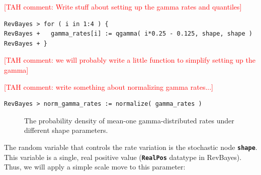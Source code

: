 \documentclass[11pt]{article}
\newcommand{\taha}[1]{{\textcolor{red}{[TAH comment: #1]}}} %
\newcommand{\cl}[1]{{\texttt{\textbf{#1}}}}
\begin{document}
\taha{Write stuff about setting up the gamma rates and quantiles}
{\tt\begin{snugshade*}
\begin{lstlisting}
RevBayes > for ( i in 1:4 ) {
RevBayes +   gamma_rates[i] := qgamma( i*0.25 - 0.125, shape, shape )
RevBayes + }
\end{lstlisting}
\end{snugshade*}}
\taha{we will probably write a little function to simplify setting up the gamma}

\taha{write something about normalizing gamma rates...}
{\tt \begin{snugshade*}
\begin{lstlisting}
RevBayes > norm_gamma_rates := normalize( gamma_rates )
\end{lstlisting}
\end{snugshade*}}



\begin{figure}[h]
\centering
{}
\caption{\small The probability density of mean-one gamma-distributed rates under different shape parameters.}
\label{asrhGammaFig}
\end{figure}

The random variable that controls the rate variation is the stochastic node \cl{shape}. This variable is a single, real positive value (\cl{RealPos} datatype in RevBayes). 
Thus, we will apply a simple scale move to this parameter:
\end{document}
